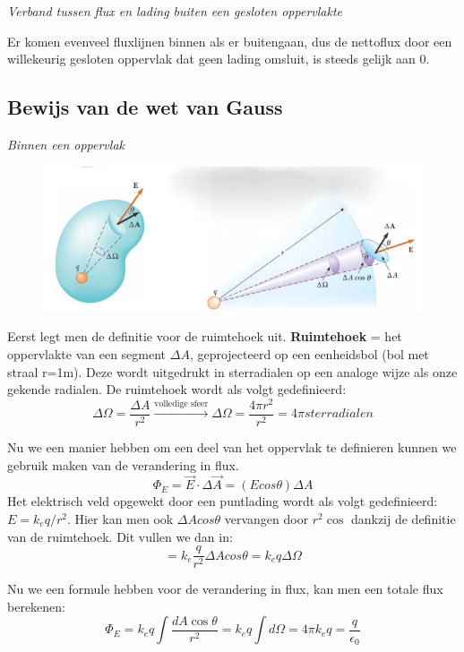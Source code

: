 \documentclass[12pt,a4paper]{article}
\begin{document}
   	\textit{Verband tussen flux en lading buiten een gesloten oppervlakte}
   	
   	Er komen evenveel fluxlijnen binnen als er buitengaan, dus de nettoflux door een willekeurig gesloten oppervlak dat geen lading omsluit, is steeds gelijk aan 0.
   	
   	\subsection{Bewijs van de wet van Gauss}
   	\textit{Binnen een oppervlak}
   	\begin{figure}[h]
   		\centering
   		\includegraphics[width=0.7\linewidth]{bewijs_gauss}
   		\label{fig:bewijsgauss}
   	\end{figure}
   Eerst legt men de definitie voor de ruimtehoek uit. \textbf{Ruimtehoek} = het oppervlakte van een segment $\Delta A$, geprojecteerd op een eenheidsbol (bol met straal r=1m). Deze wordt uitgedrukt in sterradialen op een analoge wijze als onze gekende radialen. De ruimtehoek wordt als volgt gedefinieerd:
   \[\Delta\Omega = \frac{\Delta A}{r^2} \xrightarrow{\text{volledige sfeer}} \Delta\Omega = \frac{4\pi r^2}{r^2} = 4\pi sterradialen\]
   
   Nu we een manier hebben om een deel van het oppervlak te definieren kunnen we gebruik maken van de verandering in flux.
   \[\Phi_E = \vec{E}\cdot\Delta\vec{A} = (Ecos\theta)\Delta A\]
   Het elektrisch veld opgewekt door een puntlading wordt als volgt gedefinieerd: \(E = k_eq/r^2\). Hier kan men ook $\Delta A cos\theta$ vervangen door $r^2\cos$ dankzij de definitie van de ruimtehoek. Dit vullen we dan in:
   \[= k_e\frac{q}{r^2}\Delta A cos\theta = k_eq\Delta\Omega\]
   
   Nu we een formule hebben voor de verandering in flux, kan men een totale flux berekenen: 
   \[\Phi_E = k_eq\int \frac{dA\cos\theta}{r^2} = k_eq\int d\Omega = 4\pi k_e q = \frac{q}{\epsilon_0}\]
   
\end{document}
